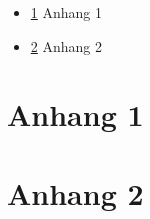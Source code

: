 
\begin{itemize}
	\item \ref{apx:1} Anhang 1 \dotfill{} \pageref{apx:1}
	\item \ref{apx:2} Anhang 2 \dotfill{} \pageref{apx:2}
\end{itemize}

\section{Anhang 1}
\label{apx:1}

\section{Anhang 2}
\label{apx:2}